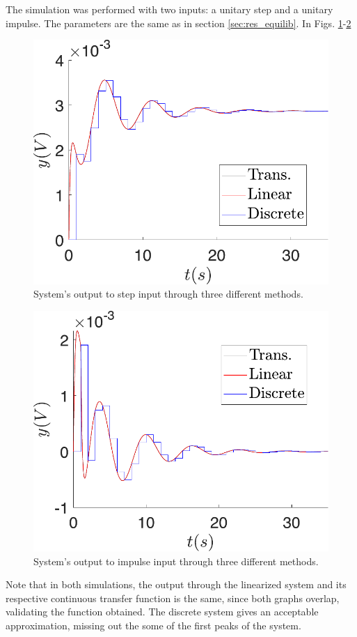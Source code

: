  The simulation was performed with two inputs: a unitary step and a unitary impulse. The parameters are the same as in section \ref{sec:res_equilib}. In Figs. \ref{fig:tfsStep}-\ref{fig:tfsImpulse}
\begin{figure}[ht]
    \centering
    \includegraphics[scale=0.5]{figs/transferFunc/Comp_trans_lineal_unitstep.pdf}
    \caption{System's output to step input through three different methods.}
    \label{fig:tfsStep}
\end{figure}

\begin{figure}[ht]
    \centering
    \includegraphics[scale=0.5]{figs/transferFunc/Comp_trans_lineal_impulse.pdf}
    \caption{System's output to impulse input through three different methods.}
    \label{fig:tfsImpulse}
\end{figure}
Note that in both simulations, the output through the linearized system and its respective continuous transfer function is the same, since both graphs overlap, validating the function obtained. The discrete system gives an acceptable approximation, missing out the some of the first peaks of the system.

